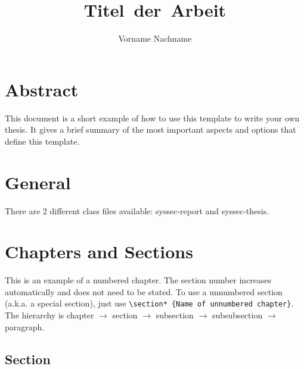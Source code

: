\documentclass[bachelorthesis, deutsch]{syssec-thesis} %
\author{Vorname Nachname}
\title{Titel~der~Arbeit}
\begin{document}
\maketitle				%


\cleardoublepage
{}
%
\tableofcontents		%
\newpage
\listofillustrations	%


\cleardoublepage




\chapter*{Abstract}
%

This document is a short example of how to use this template to write your own thesis. It gives a brief summary of the most important aspects and options that define this template.


\cleardoublepage
{}
\setcounter{page}{1}


\chapter{General}

There are 2 different class files available: syssec-report and syssec-thesis. 



\chapter{Chapters and Sections}

This is an example of a numbered chapter. The section number increases automatically and does not need to be stated. To use a unnumbered section (a.k.a. a special section), just use \texttt{\textbackslash section* \{Name of unnumbered chapter\}}. The hierarchy is chapter $\rightarrow$ section $\rightarrow$ subsection $\rightarrow$ subsubsection $\rightarrow$ paragraph.

\section{Section}
\end{document}
